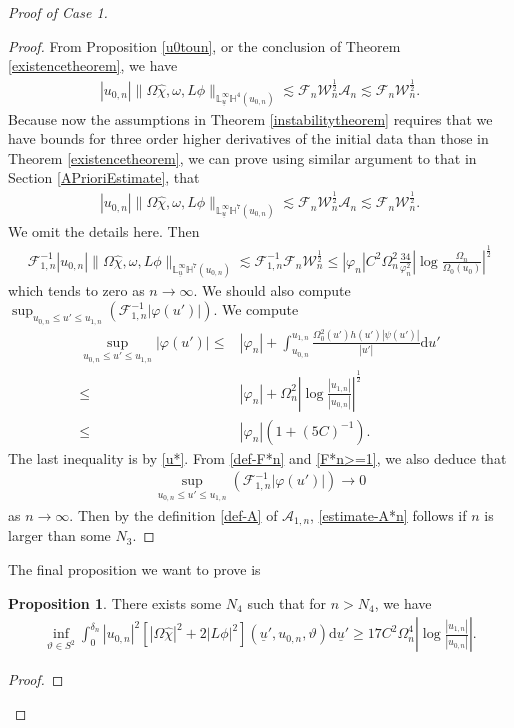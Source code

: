 \documentclass[11pt,reqno]{amsart}
\theoremstyle{definition}
\newtheorem{proposition}{Proposition}[section]
\numberwithin{equation}{section}
\newcommand{\D}{\mathrm{d}}
\renewcommand{\L}{\mathbb{L}}
\renewcommand{\H}{\mathbb{H}}
\def\chih{\widehat{\chi}}
\def\ub{\underline{u}}
\begin{document}
\begin{proof}[Proof of Case 1]
\begin{proof}
From Proposition \ref{u0toun}, or the conclusion of Theorem \ref{existencetheorem}, we have
\begin{align*}
|u_{0,n}|\|\Omega\chih, \omega, L\phi\|_{\L^\infty_{\ub}\H^4(u_{0,n})}\lesssim\mathscr{F}_n\mathscr{W}_n^{\frac{1}{2}}\mathcal{A}_n\lesssim \mathscr{F}_n\mathscr{W}_n^{\frac{1}{2}}.
\end{align*}
Because now the assumptions in Theorem \ref{instabilitytheorem} requires that we have bounds for three order higher derivatives of the initial data than those in Theorem \ref{existencetheorem}, we can prove using similar argument to that in Section \ref{APrioriEstimate}, that
\begin{align*}
|u_{0,n}|\|\Omega\chih,\omega, L\phi\|_{\L^\infty_{\ub}\H^7(u_{0,n})}\lesssim\mathscr{F}_n\mathscr{W}_n^{\frac{1}{2}}\mathcal{A}_n\lesssim \mathscr{F}_n\mathscr{W}_n^{\frac{1}{2}}.
\end{align*}
We omit the details here. Then
\begin{align*}
\mathscr{F}_{1,n}^{-1}|u_{0,n}|\|\Omega\chih, \omega, L\phi\|_{\L^\infty_{\ub}\H^7(u_{0,n})}\lesssim \mathscr{F}_{1,n}^{-1}\mathscr{F}_n\mathscr{W}_n^{\frac{1}{2}}\le|\varphi_n|C^2\Omega_n^2\frac{34}{\varphi_n^2} \left|\log\frac{\Omega_n}{\Omega_0(u_0)}\right|^{\frac{1}{2}}
\end{align*}
which tends to zero as $n\to\infty$. We should also compute $\displaystyle\sup_{u_{0,n}\le u'\le u_{1,n}}(\mathscr{F}_{1,n}^{-1}|\varphi(u')|)$. We compute
\begin{align*}
\sup_{u_{0,n}\le u'\le u_{1,n}}|\varphi(u')|\le&|\varphi_n|+\int_{u_{0,n}}^{u_{1,n}}\frac{\Omega_0^2(u')h(u')|\psi(u')|}{|u'|}\D u'\\
\le&|\varphi_n|+\Omega_n^2\left|\log\frac{|u_{1,n}|}{|u_{0,n}|}\right|^{\frac{1}{2}}\\
\le&|\varphi_n|(1+(5C)^{-1}).
\end{align*}
The last inequality is by \eqref{u*}. From \eqref{def-F*n} and \eqref{F*n>=1}, we also deduce that 
\begin{align*}\displaystyle\sup_{u_{0,n}\le u'\le u_{1,n}}(\mathscr{F}_{1,n}^{-1}|\varphi(u')|)\to0
\end{align*} as $n\to\infty$. Then by the definition \eqref{def-A} of $\mathcal{A}_{1,n}$, \eqref{estimate-A*n} follows if $n$ is larger than some $N_3$.

\end{proof}

The final proposition we want to prove is
\begin{proposition} There exists some $N_4$ such that for $n>N_4$, we have
\begin{align}\label{conditiontrappedLphiunpre}
\inf_{\vartheta\in S^2}\int_0^{\delta_n}|u_{0,n}|^2[|\Omega\chih|^2+2|L\phi|^2](\ub',u_{0,n},\vartheta)\D\ub'\ge 17C^2\Omega_n^4\left|\log\frac{|u_{1,n}|}{|u_{0,n}|}\right|.
\end{align} 
\end{proposition}
\begin{proof}


\end{proof}
\end{proof}
\end{document}
